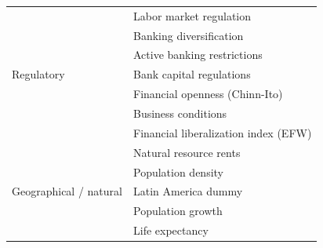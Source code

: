 \begin{refsection}
\begin{subappendices}
\begin{table}[ht!]
\begin{tabular}{ll}
      \midrule
      \multirow{7}{*}{Regulatory}  & Labor market regulation \\
                    & Banking diversification \\
                    & Active banking restrictions \\
                    & Bank capital regulations \\
                    & Financial openness (Chinn-Ito) \\
                    & Business conditions \\
                    & Financial liberalization index (EFW) \\
     
      \midrule
      \multirow{5}{*}{Geographical / natural} & Natural resource rents \\
                                    & Population density \\
                                    & Latin America dummy \\
                                    & Population growth \\
                                    & Life expectancy \\
      \bottomrule
    \end{tabular}
    \end{table}
    \clearpage
    

\end{subappendices}
\end{refsection}

